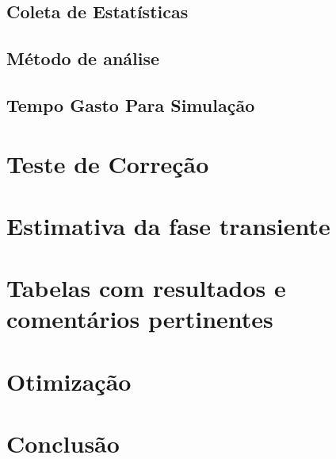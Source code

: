 \documentclass[a4paper,10pt]{article}
\begin{document}
\subsection{Coleta de Estatísticas}
\subsection{Método de análise}
\subsection{Tempo Gasto Para Simulação}

\pagebreak

\section{Teste de Correção}
\pagebreak

\section{Estimativa da fase transiente}
\pagebreak

\section{Tabelas com resultados e comentários pertinentes}
\pagebreak

\section{Otimização}
\pagebreak

\section{Conclusão}

\pagebreak
\end{document}
